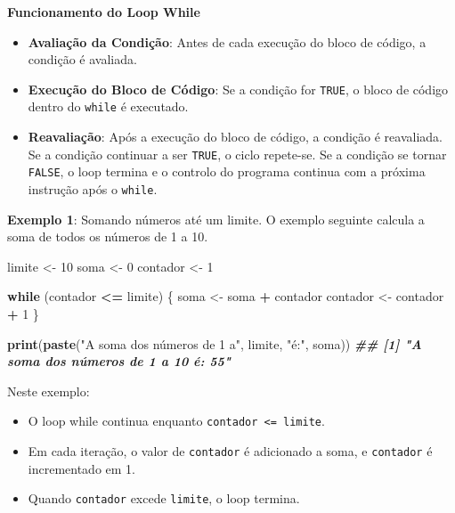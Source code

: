 \documentclass[
]{book}
\newenvironment{Shaded}{\begin{snugshade}}{\end{snugshade}}
\newcommand{\ControlFlowTok}[1]{\textcolor[rgb]{0.13,0.29,0.53}{\textbf{#1}}}
\newcommand{\DecValTok}[1]{\textcolor[rgb]{0.00,0.00,0.81}{#1}}
\newcommand{\DocumentationTok}[1]{\textcolor[rgb]{0.56,0.35,0.01}{\textbf{\textit{#1}}}}
\newcommand{\FunctionTok}[1]{\textcolor[rgb]{0.13,0.29,0.53}{\textbf{#1}}}
\newcommand{\NormalTok}[1]{#1}
\newcommand{\OtherTok}[1]{\textcolor[rgb]{0.56,0.35,0.01}{#1}}
\newcommand{\SpecialCharTok}[1]{\textcolor[rgb]{0.81,0.36,0.00}{\textbf{#1}}}
\newcommand{\StringTok}[1]{\textcolor[rgb]{0.31,0.60,0.02}{#1}}
\providecommand{\tightlist}{%
  \setlength{\itemsep}{0pt}\setlength{\parskip}{0pt}}
\begin{document}
\textbf{Funcionamento do Loop While}

\begin{itemize}
\item
  \textbf{Avaliação da Condição}: Antes de cada execução do bloco de
  código, a condição é avaliada.
\item
  \textbf{Execução do Bloco de Código}: Se a condição for \texttt{TRUE}, o bloco
  de código dentro do \texttt{while} é executado.
\item
  \textbf{Reavaliação}: Após a execução do bloco de código, a condição é
  reavaliada. Se a condição continuar a ser \texttt{TRUE}, o ciclo repete-se.
  Se a condição se tornar \texttt{FALSE}, o loop termina e o controlo do
  programa continua com a próxima instrução após o \texttt{while}.
\end{itemize}

\textbf{Exemplo 1}: Somando números até um limite. O exemplo seguinte calcula
a soma de todos os números de 1 a 10.

\begin{Shaded}
\begin{Highlighting}[]
\NormalTok{limite }\OtherTok{\textless{}{-}} \DecValTok{10}
\NormalTok{soma }\OtherTok{\textless{}{-}} \DecValTok{0}
\NormalTok{contador }\OtherTok{\textless{}{-}} \DecValTok{1}

\ControlFlowTok{while}\NormalTok{ (contador }\SpecialCharTok{\textless{}=}\NormalTok{ limite) \{}
\NormalTok{  soma }\OtherTok{\textless{}{-}}\NormalTok{ soma }\SpecialCharTok{+}\NormalTok{ contador}
\NormalTok{  contador }\OtherTok{\textless{}{-}}\NormalTok{ contador }\SpecialCharTok{+} \DecValTok{1}
\NormalTok{\}}

\FunctionTok{print}\NormalTok{(}\FunctionTok{paste}\NormalTok{(}\StringTok{"A soma dos números de 1 a"}\NormalTok{, limite, }\StringTok{"é:"}\NormalTok{, soma))}
\DocumentationTok{\#\# [1] "A soma dos números de 1 a 10 é: 55"}
\end{Highlighting}
\end{Shaded}

Neste exemplo:

\begin{itemize}
\tightlist
\item
  O loop while continua enquanto \texttt{contador\ \textless{}=\ limite}.
\item
  Em cada iteração, o valor de \texttt{contador} é adicionado a soma, e
  \texttt{contador} é incrementado em 1.
\item
  Quando \texttt{contador} excede \texttt{limite}, o loop termina.
\end{itemize}
\end{document}
